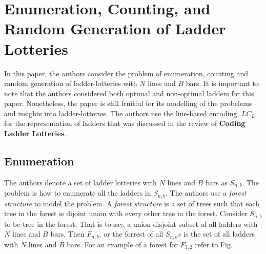\section{Enumeration, Counting, and Random Generation of Ladder Lotteries}

In this paper, the authors consider the problem of enumeration, counting and 
random generation of ladder-lotteries with $N$ lines and $B$ bars. 
It is important to note that the authors considered both optimal and 
non-optimal ladders for this paper. Nonetheless, the paper is still fruitful 
for its modelling of the probelems and insights into ladder-lotteries.
The authors use  the line-based encoding, $LC_{L}$ for the representation of ladders 
that was discussed in the review of \textbf{Coding Ladder Lotteries}.

\subsection{Enumeration}
The authors denote a set of ladder lotteries with $N$ lines and 
$B$ bars as $S_{n,b}$. The problem is how to enumerate all the 
ladders in $S_{n,b}$. The authors use a \emph{forest structure}
to model the problem. A \emph{forest structure} is a set of trees 
such that each tree in the forest is dijoint union with every other 
tree in the forest. Consider $S_{n,b}$ to be tree in the forest.
That is to say, a union disjoint subset of all ladders with $N$
lines and $B$ bars. Then $F_{n,b}$, or the forrest of all $S_{n,b}s$
is the set of all ladders with $N$ lines and $B$ bars. For an example 
of a forest for $F_{3,2}$ refer to Fig.\par %

